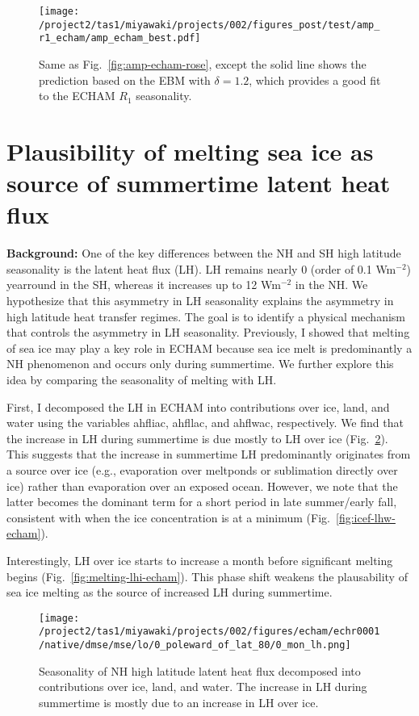 \documentclass{article}
\begin{document}
\begin{figure}
    \texttt{[image: /project2/tas1/miyawaki/projects/002/figures\_post/test/amp\_r1\_echam/amp\_echam\_best.pdf]}
    \caption{Same as Fig.~\ref{fig:amp-echam-rose}, except the solid line shows the prediction based on the \cite{rose2017} EBM with $\delta=1.2$, which provides a good fit to the ECHAM $R_1$ seasonality.}
    \label{fig:amp-echam-best}
\end{figure}

\section{Plausibility of melting sea ice as source of summertime latent heat flux}
\textbf{Background:} One of the key differences between the NH and SH high latitude seasonality is the latent heat flux (LH). LH remains nearly 0 (order of 0.1 Wm$^{-2}$) yearround in the SH, whereas it increases up to 12 Wm$^{-2}$ in the NH. We hypothesize that this asymmetry in LH seasonality explains the asymmetry in high latitude heat transfer regimes. The goal is to identify a physical mechanism that controls the asymmetry in LH seasonality. Previously, I showed that melting of sea ice may play a key role in ECHAM because sea ice melt is predominantly a NH phenomenon and occurs only during summertime. We further explore this idea by comparing the seasonality of melting with LH.

First, I decomposed the LH in ECHAM into contributions over ice, land, and water using the variables ahfliac, ahfllac, and ahflwac, respectively. We find that the increase in LH during summertime is due mostly to LH over ice (Fig.~\ref{fig:lh-echam}). This suggests that the increase in summertime LH predominantly originates from a source over ice (e.g., evaporation over meltponds or sublimation directly over ice) rather than evaporation over an exposed ocean. However, we note that the latter becomes the dominant term for a short period in late summer/early fall, consistent with when the ice concentration is at a minimum (Fig.~\ref{fig:icef-lhw-echam}).

Interestingly, LH over ice starts to increase a month before significant melting begins (Fig.~\ref{fig:melting-lhi-echam}). This phase shift weakens the plausability of sea ice melting as the source of increased LH during summertime.   

\begin{figure}
    \texttt{[image: /project2/tas1/miyawaki/projects/002/figures/echam/echr0001/native/dmse/mse/lo/0\_poleward\_of\_lat\_80/0\_mon\_lh.png]}
    \caption{Seasonality of NH high latitude latent heat flux decomposed into contributions over ice, land, and water. The increase in LH during summertime is mostly due to an increase in LH over ice.}
    \label{fig:lh-echam}
\end{figure}
\end{document}

